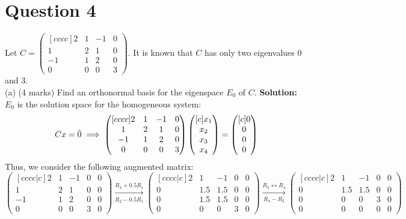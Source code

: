 \documentclass{article}
\begin{document}
\section*{Question 4}
\newline
Let $C = \begin{pmatrix}[cccc]
    2 & 1 & -1 & 0 \\
    1 & 2 & 1 & 0\\
    -1 & 1 & 2 & 0 \\
    0 & 0 & 0 & 3
    \end{pmatrix}$. It is known that $C$ has only two eigenvalues 0 and 3.
\newline
\newline
\\ (a) (4 marks)  Find an orthonormal basis for the eigenspace $E_0$ of $C$.
\newline
\textbf{Solution:}
$E_0$ is the solution space for the homogeneous system:
$$Cx = \Tilde{0} \implies \begin{pmatrix}[cccc]
    2 & 1 & -1 & 0 \\
    1 & 2 & 1 & 0\\
    -1 & 1 & 2 & 0 \\
    0 & 0 & 0 & 3
    \end{pmatrix} 
    \begin{pmatrix}[c] x_1 \\ x_2 \\ x_3 \\ x_4 \end{pmatrix} = 
     \begin{pmatrix}[c] 0 \\ 0 \\ 0 \\ 0 \end{pmatrix}$$
Thus, we consider the following augmented matrix:
$$
\begin{pmatrix}[cccc|c]
    2 & 1 & -1 & 0 & 0\\
    1 & 2 & 1 & 0 & 0\\
    -1 & 1 & 2 & 0 & 0\\
    0 & 0 & 0 & 3 & 0
\end{pmatrix}
\xrightarrow[R_2 - 0.5 R_1]{R_3 + 0.5 R_1}
\begin{pmatrix}[cccc|c]
    2 & 1 & -1 & 0 & 0\\
    0 & 1.5 & 1.5 & 0 & 0\\
    0 & 1.5 & 1.5 & 0 & 0\\
    0 & 0 & 0 & 3 & 0
\end{pmatrix}
\xrightarrow[R_4 - R_2]{R_3 \leftrightarrow R_4}
\begin{pmatrix}[cccc|c]
    2 & 1 & -1 & 0 & 0\\
    0 & 1.5 & 1.5 & 0 & 0\\
    0 & 0 & 0 & 3 & 0\\
    0 & 0 & 0 & 0 & 0
\end{pmatrix}
$$
\end{document}
